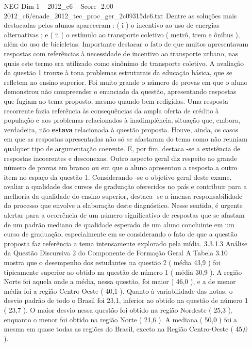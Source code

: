 \begin{textsample}{NEG Dim 1 – 2012\_c6 – Score -2.00 – 2012\_c6/enade\_2012\_tec\_proc\_ger\_2c09315dc6.txt}
Dentre as soluções mais destacadas pelos alunos apareceram : ( i ) o incentivo ao uso de energias alternativas ; e ( ii ) o estímulo ao transporte coletivo ( metrô, trem e ônibus ), além do uso de bicicletas.
Importante destacar o fato de que muitos apresentavam respostas com referências à necessidade de incentivo ao transporte urbano, nas quais este termo era utilizado como sinônimo de transporte coletivo.
A avaliação da questão 1 trouxe à tona problemas estruturais da educação básica, que se refletem no ensino superior.
Foi muito grande o número de provas em que o aluno demonstrou não compreender o enunciado da questão, apresentando respostas que fugiam ao tema proposto, mesmo quando bem redigidas.
Uma resposta recorrente fazia referência às consequências da ampla oferta de crédito à população e aos problemas relacionados à inadimplência, situação que, embora, verdadeira, não \textbf{estava} relacionada à questão proposta.
Houve, ainda, os casos em que as respostas apresentadas não só se afastaram do tema como não reuniam qualquer tipo de argumentação coerente.
E, por fim, destaca -se a existência de respostas incoerentes e desconexas.
Outro aspecto geral diz respeito ao grande número de provas em branco ou em que o aluno apresentou a resposta a outro item no espaço da questão 1.
Considerando -se o objetivo geral deste exame, avaliar a qualidade dos cursos de graduação oferecidos no país e contribuir para a melhoria da qualidade do ensino superior, destaca -se a imensa responsabilidade do processo que envolve a elaboração deste diagnóstico.
Nesse sentido, é urgente alertar para a ocorrência de um número significativo de respostas que se afastam de um padrão mediano de qualidade esperado de um aluno concluinte em um curso de graduação, especialmente em se considerando o fato de que a questão proposta faz referência a tema intensamente explorado pela mídia. 3.3.1.3 Análise da Questão Discursiva 2 do Componente de Formação Geral A Tabela 3.10 mostra que o desempenho dos estudantes na questão 2 ( média 43,9 ) foi tipicamente superior ao obtido na questão de número 1 ( média 30,9 ).
A região Norte foi aquela onde a média, nessa questão, foi maior ( 46,0 ), e a de menor média foi a região Centro-Oeste ( 40,1 ).
Quanto à variabilidade das notas, o desvio padrão de todo o Brasil foi 23,1, inferior ao obtido na questão de número 1 ( 23,7 ).
O maior desvio nessa questão foi obtido na região Nordeste ( 25,3 ), enquanto o menor foi obtido na região Norte ( 21,6 ).
A mediana ( 50,0 ) foi a mesma em quase todas as regiões do Brasil, exceto na Região Centro-Oeste ( 45,0 ).

\end{textsample}
